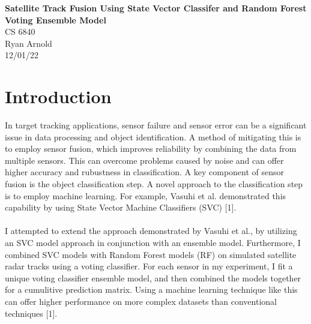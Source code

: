 \documentclass[./report_entry.tex]{subfiles}
\begin{document}
    
    \begin{titlepage}
        \noindent
        \centering \Huge \textbf{Satellite Track Fusion Using State Vector Classifer and Random Forest Voting Ensemble Model} \\
        CS 6840\\
        Ryan Arnold\\
        12/01/22
        \vspace{24pt}
        \clearpage
    \end{titlepage}  

    \section*{Introduction}

    \noindent In target tracking applications, sensor failure and sensor error can be a significant issue in
    data processing and object identification.  A method of mitigating this is to employ sensor fusion,
    which improves reliability by combining the data from multiple sensors.  This can
    overcome problems caused by noise and can offer higher accuracy and rubustness in classification.
    A key component of sensor fusion is the object classification step.
    A novel approach to the classification step is to employ machine learning.  For example, Vasuhi et al. demonstrated
    this capability by using State Vector Machine Classifiers (SVC) [1].
    \\ \\
    I attempted to extend the approach demonstrated by Vasuhi et al., by utilizing an SVC model approach in conjunction with
    an ensemble model.  Furthermore, I combined SVC models with Random Forest models (RF) on simulated satellite radar tracks
    using a voting classifier. For each sensor in my experiment, I fit a unique voting classifier ensemble model, and then combined the models together
    for a cumulitive prediction matrix. 
    Using a machine learning technique like this can offer higher performance on more complex datasets than conventional techniques [1].
    \clearpage
\end{document}
